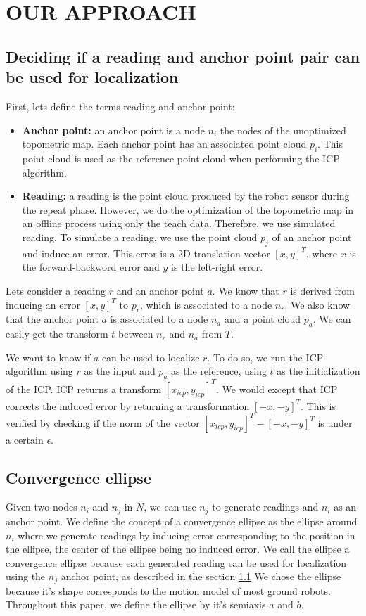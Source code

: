 \documentclass[letterpaper,10 pt,conference]{ieeeconf}
\begin{document}
\section{OUR APPROACH}
\label{approach}

\subsection{Deciding if a reading and anchor point pair can be used for localization}
\label{approach-deciding-converge}

First, lets define the terms reading and anchor point:

\begin{itemize}
  \item \textbf{Anchor point:} an anchor point is a node $n_i$ the nodes of the unoptimized
    topometric map. Each anchor point has an associated point cloud $p_i$. This point cloud is used
    as the reference point cloud when performing the ICP algorithm.
  \item \textbf{Reading:} a reading is the point cloud produced by the robot sensor during the
    repeat phase. However, we do the optimization of the topometric map in an offline process using
only the teach data. Therefore, we use simulated reading. To simulate a reading, we use the point
cloud $p_j$ of an anchor point and induce an error. This error is a 2D translation vector $[x,y]^T$, where $x$ is the forward-backword error and $y$ is the left-right error.
\end{itemize}

Lets consider a reading $r$ and an anchor point $a$. We know that $r$ is derived from inducing an error $[x, y]^T$ to $p_r$, which is associated to a node $n_r$.
We also know that the anchor point $a$ is associated to a node $n_a$ and a point cloud $p_a$. We can easily get the transform $t$ between $n_r$ and $n_a$ from $T$.


We want to know if $a$ can be used to localize $r$. To do so, we run the ICP algorithm using $r$ as the input and $p_a$ as the reference, using $t$
as the initialization of the ICP. ICP returns a transform $[x_{icp}, y_{icp}]^T$. We would except that ICP corrects the induced error by returning
a transformation $[-x, -y]^T$. This is verified by checking if the norm of the vector $[x_{icp}, y_{icp}]^T - [-x, -y]^T$ is under a certain $\epsilon$.


\subsection{Convergence ellipse}
Given two nodes $n_i$ and $n_j$ in $N$, we can use $n_j$ to generate readings and $n_i$ as an anchor
point.  We define the concept of a convergence ellipse as the ellipse around $n_i$ where we generate
readings by inducing error corresponding to the position in the ellipse, the center of the ellipse
being no induced error. We call the ellipse a convergence ellipse because each generated reading can
be used for localization using the $n_j$ anchor point, as described in the section
\ref{approach-deciding-converge} We chose the ellipse because it's shape corresponds to the motion
model of most ground robots. Throughout this paper, we define the ellipse by it's semiaxis $a$ and $b$.
\end{document}
